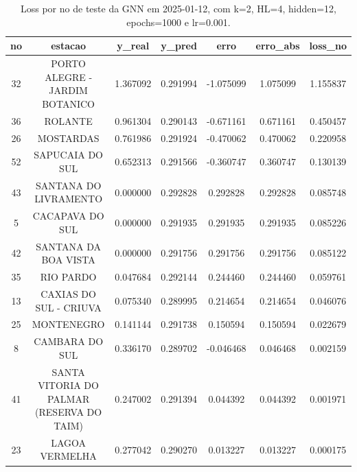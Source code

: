 \begin{table}[h]
\centering
\caption{Loss por no de teste da GNN em 2025-01-12, com k=2, HL=4, hidden=12, epochs=1000 e lr=0.001.}
\label{tab:gnn_loss_k2_hl4_h12_e1000_d20250112}
\begin{tabular}{ccccccc}
\toprule
no & estacao & y\_real & y\_pred & erro & erro\_abs & loss\_no \\
\midrule
32 & PORTO ALEGRE - JARDIM BOTANICO & 1.367092 & 0.291994 & -1.075099 & 1.075099 & 1.155837 \\
36 & ROLANTE & 0.961304 & 0.290143 & -0.671161 & 0.671161 & 0.450457 \\
26 & MOSTARDAS & 0.761986 & 0.291924 & -0.470062 & 0.470062 & 0.220958 \\
52 & SAPUCAIA DO SUL & 0.652313 & 0.291566 & -0.360747 & 0.360747 & 0.130139 \\
43 & SANTANA DO LIVRAMENTO & 0.000000 & 0.292828 & 0.292828 & 0.292828 & 0.085748 \\
5 & CACAPAVA DO SUL & 0.000000 & 0.291935 & 0.291935 & 0.291935 & 0.085226 \\
42 & SANTANA DA BOA VISTA & 0.000000 & 0.291756 & 0.291756 & 0.291756 & 0.085122 \\
35 & RIO PARDO & 0.047684 & 0.292144 & 0.244460 & 0.244460 & 0.059761 \\
13 & CAXIAS DO SUL - CRIUVA & 0.075340 & 0.289995 & 0.214654 & 0.214654 & 0.046076 \\
25 & MONTENEGRO & 0.141144 & 0.291738 & 0.150594 & 0.150594 & 0.022679 \\
8 & CAMBARA DO SUL & 0.336170 & 0.289702 & -0.046468 & 0.046468 & 0.002159 \\
41 & SANTA VITORIA DO PALMAR (RESERVA DO TAIM) & 0.247002 & 0.291394 & 0.044392 & 0.044392 & 0.001971 \\
23 & LAGOA VERMELHA & 0.277042 & 0.290270 & 0.013227 & 0.013227 & 0.000175 \\
\bottomrule
\end{tabular}
\end{table}

